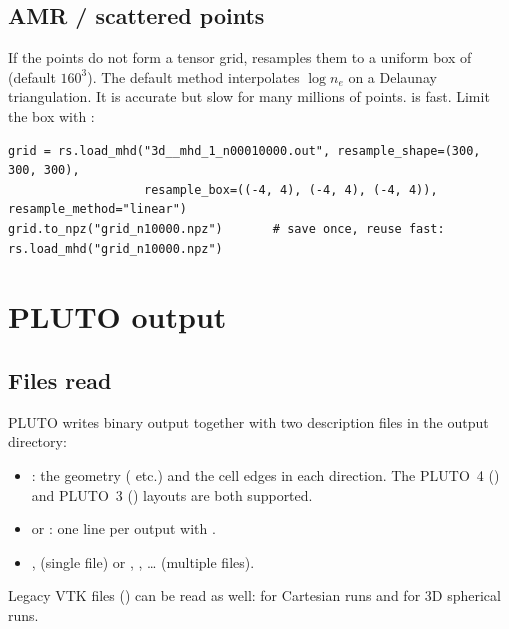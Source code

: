 \subsection*{AMR / scattered points}
If the points do not form a tensor grid,  resamples them to a uniform box
of  (default $160^3$). The default  method
interpolates $\log n_e$ on a Delaunay triangulation. It is accurate but slow for many
millions of points.  is fast. Limit the box with :

\begin{lstlisting}[style=pyex]
grid = rs.load_mhd("3d__mhd_1_n00010000.out", resample_shape=(300, 300, 300),
                   resample_box=((-4, 4), (-4, 4), (-4, 4)), resample_method="linear")
grid.to_npz("grid_n10000.npz")       # save once, reuse fast: rs.load_mhd("grid_n10000.npz")
\end{lstlisting}

\section{PLUTO output}

\subsection*{Files read}
PLUTO writes binary output together with two description files in the output
directory:

\begin{itemize}[itemsep=1pt]
\item {}: the geometry ( etc.) and the cell
      edges in each direction. The PLUTO~4 () and PLUTO~3
      () layouts are both supported.
\item {} or : one line per output with
      .
\item {},  (single file) or ,
      , \ldots{} (multiple files).
\end{itemize}

Legacy VTK files () can be read as well: 
for Cartesian runs and  for 3D spherical runs.

